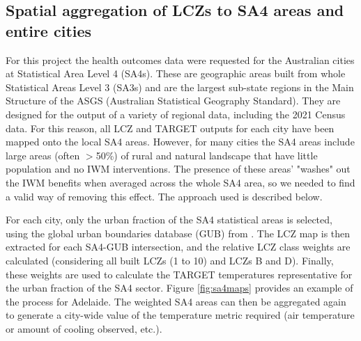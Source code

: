 \documentclass[utf8]{frontiersSCNS} %
\begin{document}
\subsection{Spatial aggregation of LCZs to SA4 areas and entire cities}

For this project the health outcomes data were requested for the Australian cities at Statistical Area Level 4 (SA4s). These are geographic areas built from whole Statistical Areas Level 3 (SA3s) and are the largest sub-state regions in the Main Structure of the ASGS (Australian Statistical Geography Standard). They are designed for the output of a variety of regional data, including the 2021 Census data. For this reason, all LCZ and TARGET outputs for each city have been mapped onto the local SA4 areas. However, for many cities the SA4 areas include large areas (often $>$50\%) of rural and natural landscape that have little population and no IWM interventions. The presence of these areas' "washes" out the IWM benefits when averaged across the whole SA4 area, so we needed to find a valid way of removing this effect. The approach used is described below.

For each city, only the urban fraction of the SA4 statistical areas is selected, using the global urban boundaries database (GUB) from \cite{Li2020b}. The LCZ map is then extracted for each SA4-GUB intersection, and the relative LCZ class weights are calculated (considering all built LCZs (1 to 10) and LCZs B and D). Finally, these weights are used to calculate the TARGET temperatures representative for the urban fraction of the SA4 sector. Figure \ref{fig:sa4maps} provides an example of the process for Adelaide. The weighted SA4 areas can then be aggregated again to generate a city-wide value of the temperature metric required (air temperature or amount of cooling observed, etc.).
\end{document}
